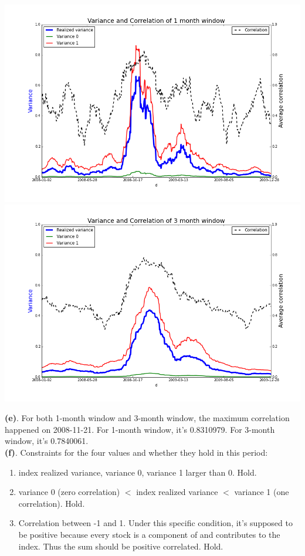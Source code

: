 \documentclass[11pt,letter]{article}
\begin{document}
\begin{center}
\includegraphics[width=6in,keepaspectratio]{4_1}
\includegraphics[width=6in,keepaspectratio]{4_2}
\end{center}

\textbf{(e)}. For both 1-month window and 3-month window, the maximum correlation happened on 2008-11-21. For 1-month window, it's 0.8310979. For 3-month window, it's 0.7840061.\\

\textbf{(f)}. Constraints for the four values and whether they hold in this period:
\begin{enumerate}
\item index realized variance, variance 0, variance 1 larger than 0. Hold.
\item variance 0 (zero correlation) $<$ index realized variance $<$ variance 1 (one correlation). Hold.
\item Correlation between -1 and 1. Under this specific condition, it's supposed to be positive because every stock is a component of and contributes to the index. Thus the sum should be positive correlated. Hold.
\end{enumerate}
\end{document}
